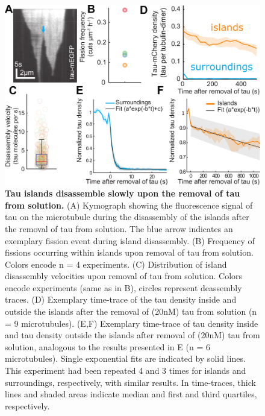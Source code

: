 \begin{figure}
	\centering
	\includegraphics[width=1\linewidth]{Figures/tauSHRINK.png}
	\caption[Tau islands disassemble slowly upon the removal of tau from solution.]{
	\textbf{Tau islands disassemble slowly upon the removal of tau from solution.} (A) Kymograph showing the fluorescence signal of tau on the microtubule during the disassembly of the islands after the removal of tau from solution. The blue arrow indicates an exemplary fission event during island disassembly. (B) Frequency of fissions occurring within islands upon removal of tau from solution. Colors encode n = 4 experiments. (C) Distribution of island disassembly velocities upon removal of tau from solution. Colors encode experiments (same as in B), circles represent deassembly traces. (D) Exemplary time-trace of the tau density inside and outside the islands after the removal of (20nM) tau from solution (n = 9 microtubules). (E,F) Exemplary time-trace of tau density inside and tau density outside the islands after removal of (20nM) tau from solution, analogous to the results presented in E (n = 6 microtubules). Single exponential fits are indicated by solid lines. This experiment had been repeated 4 and 3 times for islands and surroundings, respectively, with similar results. In time-traces, thick lines and shaded areas indicate median and first and third quartiles, respectively. 
		}\label{tauSHRINK}
\end{figure}
